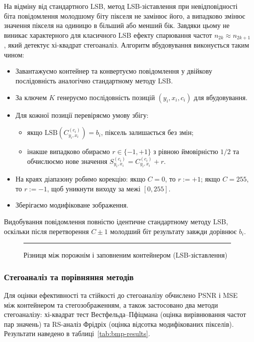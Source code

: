 На відміну від стандартного LSB, метод LSB-зіставлення при невідповідності
біта повідомлення молодшому біту пікселя не замінює його, а випадково
змінює значення пікселя на одиницю в більший або менший бік. Завдяки цьому
не виникає характерного для класичного LSB ефекту спарювання частот
$n_{2k} \approx n_{2k+1}$, який детектує хі-квадрат стегоаналіз. Алгоритм
вбудовування виконується таким чином:
\begin{itemize}
    \item Завантажуємо контейнер та конвертуємо повідомлення у двійкову
    послідовність аналогічно стандартному методу LSB.
    \item За ключем $K$ генеруємо послідовність позицій
    $(y_i, x_i, c_i)$ для вбудовування.
    \item Для кожної позиції перевіряємо умову збігу:
    \begin{itemize}
        \item якщо $\mathrm{LSB}(C_{y_i, x_i}^{(c_i)}) = b_i$, піксель
        залишається без змін;
        \item інакше випадково обираємо $r \in \{-1, +1\}$ з рівною
        ймовірністю $1/2$ та обчислюємо нове значення
        $S_{y_i, x_i}^{(c_i)} = C_{y_i, x_i}^{(c_i)} + r$.
    \end{itemize}
    \item На краях діапазону робимо корекцію: якщо $C = 0$, то $r := +1$;
    якщо $C = 255$, то $r := -1$, щоб уникнути виходу за межі $[0, 255]$.
    \item Зберігаємо модифіковане зображення.
\end{itemize}
Видобування повідомлення повністю ідентичне стандартному методу LSB,
оскільки після перетворення $C \pm 1$ молодший біт результату завжди
дорівнює $b_i$.

\begin{figure}[h!]
    \centering
    \rule{0.8\textwidth}{4cm}
    \caption{Різниця між порожнім і заповненим контейнером (LSB-зіставлення)}
    \label{fig:lsbm-diff}
\end{figure}

\subsubsection*{Стегоаналіз та порівняння методів}

Для оцінки ефективності та стійкості до стегоаналізу обчислено PSNR і MSE
між контейнером та стегозображенням, а також застосовано два методи
стегоаналізу: хі-квадрат тест Вестфельда--Пфіцмана (оцінка вирівнювання
частот пар значень) та RS-аналіз Фрідріх (оцінка відсотка модифікованих
пікселів). Результати наведено в таблиці~\ref{tab:bmp-results}.

